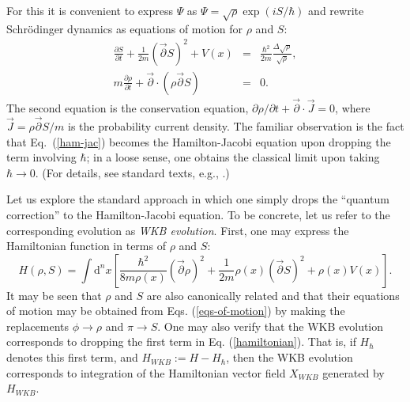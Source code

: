 \documentclass[12pt,aps,eqsecnum,tighten,nofootinbib]{revtex4-2}
\def\be{\begin{equation}}
\def\ee{\end{equation}}
\def\ba{\begin{eqnarray}}
\def\ea{\end{eqnarray}}
\def\d{{\mathrm d}}
\def\i{{i}}
\newcommand{\eqn}[1]{Eq.~(\ref{#1})}
\begin{document}
For this it is convenient to express $\Psi$ as $\Psi =
\sqrt{\rho}\exp( \i S/\hbar )$ and rewrite Schr\"odinger dynamics as
equations of motion for $\rho$ and $S$:
%
\ba\label{ham-jac}
\frac{\partial S}{\partial t} + \frac{1}{2m}(\vec{\partial}S)^2
+ V(x)&=& \frac{\hbar^2}{2m} \frac{\Delta \sqrt{\rho}}
{\sqrt{\rho}},\\
%
m\frac{\partial \rho}{\partial t} + \vec{\partial} \cdot
(\rho \vec{\partial} S) &=& 0.
\ea
%
The second equation is the conservation equation, $\partial \rho /
\partial t + \vec{\partial}\cdot \vec{J} = 0$, where $\vec{J} =
\rho\vec{\partial}S/m$ is the probability current density.  The
familiar observation is the fact that \eqn{ham-jac} becomes the
Hamilton-Jacobi equation upon dropping the term involving $\hbar$; in
a loose sense, one obtains the classical limit upon taking $\hbar
\rightarrow 0$. (For details, see standard texts, e.g.,
\cite{goldstein,lanczos}.)

Let us explore the standard approach in which one simply drops the
``quantum correction'' to the Hamilton-Jacobi equation.  To be
concrete, let us refer to the corresponding evolution
as {\it WKB evolution}.  First, one may
express the Hamiltonian function in terms of $\rho$ and $S$:
%
\be \label{hamiltonian}
H(\rho, S) = \int \d^n\!x \left[ \frac{\hbar^2}{8m\rho(x)}
(\vec{\partial}\rho)^2
+ \frac{1}{2m}\rho(x) (\vec{\partial} S)^2 + \rho(x)V(x)\right].
\ee
%
It may be seen that $\rho$ and $S$ are also canonically related and
that their equations of motion may be obtained from
Eqs. (\ref{eqs-of-motion}) by making the replacements $\phi
\rightarrow \rho$ and $\pi \rightarrow S$.  One may also verify that
the WKB evolution corresponds to dropping the first term in
Eq. (\ref{hamiltonian}).  That is, if $H_\hbar$ denotes this first
term, and $H_{WKB} := H - H_\hbar$, then the WKB evolution corresponds
to integration of the Hamiltonian vector field $X_{WKB}$ generated by
$H_{WKB}$.
\end{document}
